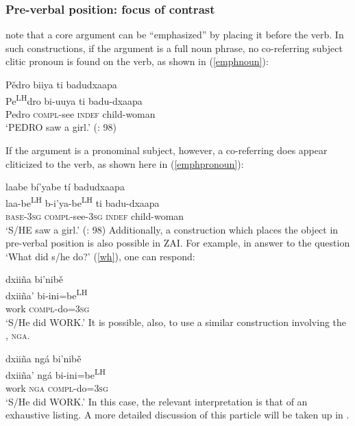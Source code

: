 \z

\subsubsection{Pre-verbal position: focus of contrast}
\citet{pickett1998} note that a core argument can be ``emphasized'' by placing it before the verb. In such constructions, if the argument is a full noun phrase, no co-referring subject clitic pronoun is found on the verb, as shown in (\ref{emphnoun}):

\ea\label{emphnoun}
\glll P\v{e}dro biiya ti badudxaapa \\		
Pe\textsuperscript{LH}dro bi-uuya ti badu-dxaapa \\
Pedro \textsc{compl}-see \textsc{indef} child-woman \\
\glt `PEDRO saw a girl.' \hfill (\citealt{pickett1998}: 98)

\z
If the argument is a pronominal subject, however, a co-referring  does appear cliticized to the verb, as shown here in (\ref{emphpronoun}):

\ea\label{emphpronoun}
\glll laabe b\'{i}'yabe t\'{i} badudxaapa \\		
laa-be\textsuperscript{LH} b-i'ya-be\textsuperscript{LH} ti badu-dxaapa \\
\textsc{base}-3\textsc{sg} \textsc{compl}-see-3\textsc{sg} \textsc{indef} child-woman \\
\glt `S/HE saw a girl.' \hfill (\citealt{pickett1998}: 98)
\z
Additionally, a construction which places the object in pre-verbal position is also possible in ZAI. For example, in answer to the question `What did s/he do?' (\ref{wh}), one can respond:

\ea\label{preverbalobj}
\glll dxiiña bi'nib\v{e} \\
dxiiña' bi-ini=be\textsuperscript{LH} \\
work \textsc{compl}-do=\textsc{3sg} \\
\glt `S/He did WORK.'
\z 
It is possible, also, to use a similar construction involving the , \textsc{nga}.  

\ea\label{preverbalnga}
\glll dxiiña ngá bi'nib\v{e} \\
dxiiña' ngá bi-ini=be\textsuperscript{LH} \\
work \textsc{nga} \textsc{compl}-do=\textsc{3sg} \\
\glt `S/He did WORK.'
\z 
In this case, the relevant interpretation is that of an exhaustive listing. A more detailed discussion of this particle will be taken up in .


